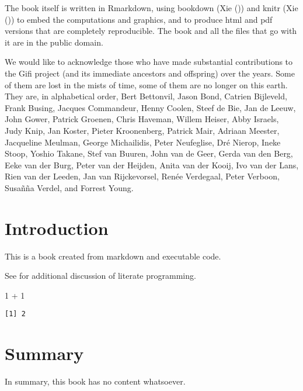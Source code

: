 \documentclass[
  12pt,
  letterpaper,
  DIV=11,
  numbers=noendperiod]{scrreprt}
\newenvironment{Shaded}{\begin{snugshade}}{\end{snugshade}}
\newcommand{\DecValTok}[1]{\textcolor[rgb]{0.68,0.00,0.00}{#1}}
\newcommand{\SpecialCharTok}[1]{\textcolor[rgb]{0.37,0.37,0.37}{#1}}
\begin{document}
The book itself is written in Rmarkdown, using bookdown (Xie
()) and knitr (Xie
()) to embed the computations and graphics,
and to produce html and pdf versions that are completely reproducible.
The book and all the files that go with it are in the public domain.

We would like to acknowledge those who have made substantial
contributions to the Gifi project (and its immediate ancestors and
offspring) over the years. Some of them are lost in the mists of time,
some of them are no longer on this earth. They are, in alphabetical
order, Bert Bettonvil, Jason Bond, Catrien Bijleveld, Frank Busing,
Jacques Commandeur, Henny Coolen, Steef de Bie, Jan de Leeuw, John
Gower, Patrick Groenen, Chris Haveman, Willem Heiser, Abby Israels, Judy
Knip, Jan Koster, Pieter Kroonenberg, Patrick Mair, Adriaan Meester,
Jacqueline Meulman, George Michailidis, Peter Neufeglise, Dré Nierop,
Ineke Stoop, Yoshio Takane, Stef van Buuren, John van de Geer, Gerda van
den Berg, Eeke van der Burg, Peter van der Heijden, Anita van der Kooij,
Ivo van der Lans, Rien van der Leeden, Jan van Rijckevorsel, Renée
Verdegaal, Peter Verboon, Susañña Verdel, and Forrest Young.


\chapter{Introduction}\label{introduction}

This is a book created from markdown and executable code.

See for additional discussion of literate programming.

\begin{Shaded}
\begin{Highlighting}[]
\DecValTok{1} \SpecialCharTok{+} \DecValTok{1}
\end{Highlighting}
\end{Shaded}

\begin{verbatim}
[1] 2
\end{verbatim}


\chapter{Summary}\label{summary}

In summary, this book has no content whatsoever.
\end{document}
